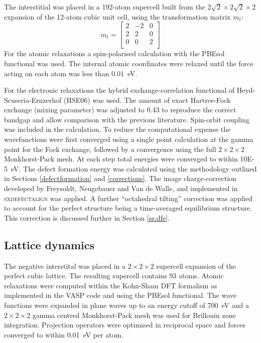 The interstitial was placed in a 192-atom supercell built from the $2\sqrt2\times2\sqrt2\times2$ expansion of the 12-atom cubic unit cell, using the transformation matrix $m_t$:
$$
m_t = \begin{bmatrix}
2 & -2 & 0 \\
2 & 2 & 0 \\
0 & 0 & 2 \\
\end{bmatrix}
$$
For the atomic relaxations a spin-polarised calculation with the PBEsol functional was used.\autocite{Perdew2008a} The internal atomic coordinates were relaxed until the force acting on each atom was less than \SI{0.01}{eV}. 

For the electronic relaxations the hybrid exchange-correlation functional of Heyd-Scuseria-Ernzerhof (HSE06) was used.\autocite{Heyd2004a,Heyd2005a} The amount of exact Hartree-Fock exchange (mixing parameter) was adjusted to 0.43 to reproduce the correct bandgap and allow comparison with the previous literature.\autocite{Meggiolaro2018,Du2015} 
Spin-orbit coupling was included in the calculation.
To reduce the computational expense the wavefunctions were first converged using a single point calculation at the gamma point for the Fock exchange, followed by a convergence using the full $2\! \times\! 2\! \times\! 2$ Monkhorst-Pack mesh. At each step total energies were converged to within \SI{10E-5}{\electronvolt}.
The defect formation energy was calculated using the methodology outlined in Sections \ref{defectformation} and \ref{corrections}. The image charge-correction developed by Freysoldt, Neugebauer and Van de Walle, and implemented in \textsc{sxdefectalign} was applied. A further ``octahedral tilting'' correction was applied to account for the perfect structure being a time-averaged equilibrium structure. This correction is discussed further in Section \ref{ss:dfe}.


\subsection{Lattice dynamics}

The negative interstital was placed in a $2\! \times\! 2\! \times\! 2$ supercell expansion of the perfect cubic lattice. The resulting supercell contains 93 atoms. Atomic relaxations were computed within the Kohn-Sham DFT formalism as implemented in the \textsc{VASP} code\autocite{Kresse1996a} and using the PBEsol functional. The wave functions were expanded in plane waves up to an energy cutoff of \SI{700}{\electronvolt} and a $2\! \times\! 2\! \times\! 2$ gamma centred Monkhorst-Pack mesh was used for Brillouin zone integration.  Projection operators were optimised in reciprocal space and forces converged to within \SI{0.01}{eV} per atom.


